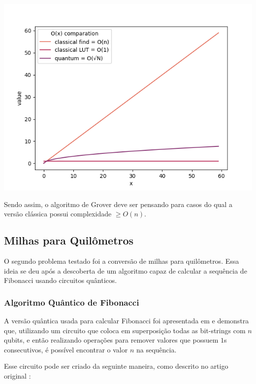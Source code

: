 \documentclass{article}
\begin{document}
\begin{center}
	\includegraphics[scale=0.5]{algorithms-finding-comparation.png}
	\label{fig:file-explorer-comparation-O}
\end{center}

Sendo assim, o algoritmo de Grover deve ser pensando para casos do qual a versão clássica possui complexidade $\ge O(n)$.


\subsection{Milhas para Quilômetros} \label{conversion}

O segundo problema testado foi a conversão de milhas para quilômetros. Essa ideia se deu após a descoberta de um algoritmo capaz de calcular a sequência de Fibonacci usando circuitos quânticos.

\subsubsection{Algoritmo Quântico de Fibonacci}

A versão quântica usada para calcular Fibonacci foi apresentada em \cite{gilliam2020canonical} e  demonstra que, utilizando um circuito que coloca em superposição todas as bit-strings com $n$ qubits, e então realizando operações para remover valores que possuem $1$s consecutivos, é possível encontrar o valor $n$ na sequência.

Esse circuito pode ser criado da seguinte maneira, como descrito no artigo original \cite{gilliam2020canonical}:
\end{document}
